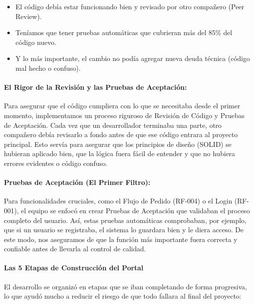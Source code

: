 \begin{itemize}
\item El código debía estar funcionando bien y revisado por otro compañero (Peer Review).

\item Teníamos que tener pruebas automáticas que cubrieran más del 85\% del código nuevo.

\item Y lo más importante, el cambio no podía agregar nueva deuda técnica (código mal hecho o confuso).
\end{itemize}

\paragraph{El Rigor de la Revisión y las Pruebas de Aceptación:}

Para asegurar que el código cumpliera con lo que se necesitaba desde el primer momento, implementamos un proceso riguroso de Revisión de Código y Pruebas de Aceptación. Cada vez que un desarrollador terminaba una parte, otro compañero debía revisarlo a fondo antes de que ese código entrara al proyecto principal. Esto servía para asegurar que los principios de diseño (SOLID) se hubieran aplicado bien, que la lógica fuera fácil de entender y que no hubiera errores evidentes o código confuso.

\paragraph{Pruebas de Aceptación (El Primer Filtro):} Para funcionalidades cruciales, como el Flujo de Pedido (RF-004) o el Login (RF-001), el equipo se enfocó en crear Pruebas de Aceptación que validaban el proceso completo del usuario. Así, estas pruebas automáticas comprobaban, por ejemplo, que si un usuario se registraba, el sistema lo guardara bien y le diera acceso. De este modo, nos aseguramos de que la función más importante fuera correcta y confiable antes de llevarla al control de calidad.

\paragraph{Las 5 Etapas de Construcción del Portal}

El desarrollo se organizó en etapas que se iban completando de forma progresiva, lo que ayudó mucho a reducir el riesgo de que todo fallara al final del proyecto:

